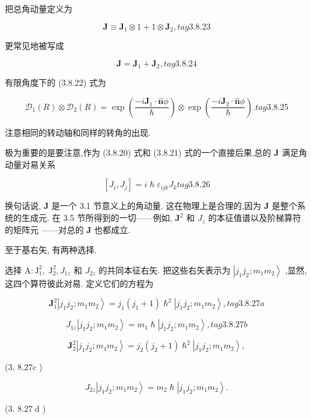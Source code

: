 把总角动量定义为

$$
\mathbf{J} \equiv {\mathbf{J}}_{1} \otimes 1 + 1 \otimes {\mathbf{J}}_{2}, tag{3.8.23}
$$

更常见地被写成

$$
\mathbf{J} = {\mathbf{J}}_{1} + {\mathbf{J}}_{2}, tag{3.8.24}
$$

有限角度下的 (3.8.22) 式为

$$
{\mathcal{D}}_{1}\left( R\right) \otimes {\mathcal{D}}_{2}\left( R\right) = \exp \left( \frac{-i{\mathbf{J}}_{1} \cdot \widehat{\mathbf{n}}\phi }{\hslash }\right) \otimes \exp \left( \frac{-i{\mathbf{J}}_{2} \cdot \widehat{\mathbf{n}}\phi }{\hslash }\right) . tag{3.8.25}
$$

注意相同的转动轴和同样的转角的出现.

极为重要的是要注意,作为 (3.8.20) 式和 (3.8.21) 式的一个直接后果,总的 $\mathbf{J}$ 满足角动量对易关系

$$
\left\lbrack {{J}_{i},{J}_{j}}\right\rbrack = i\hslash {\varepsilon }_{ijk}{J}_{k} tag{3.8.26}
$$

换句话说, $\mathbf{J}$ 是一个 3.1 节意义上的角动量. 这在物理上是合理的,因为 $\mathbf{J}$ 是整个系统的生成元. 在 3.5 节所得到的一切——例如, ${\mathbf{J}}^{2}$ 和 ${J}_{z}$ 的本征值谱以及阶梯算符的矩阵元 ——对总的 $\mathbf{J}$ 也都成立.

至于基右矢, 有两种选择.

选择 $\mathrm{A} : {\mathrm{J}}_{1}^{2},{\mathrm{\;J}}_{2}^{2},{J}_{1z}$ 和 ${J}_{2z}$ 的共同本征右矢. 把这些右矢表示为 $\left| {{j}_{1}{j}_{2};{m}_{1}{m}_{2}}\right\rangle$ ,显然, 这四个算符彼此对易. 定义它们的方程为

$$
{\mathbf{J}}_{1}^{2}\left| {{j}_{1}{j}_{2};{m}_{1}{m}_{2}}\right\rangle = {j}_{1}\left( {{j}_{1} + 1}\right) {\hslash }^{2}\left| {{j}_{1}{j}_{2};{m}_{1}{m}_{2}}\right\rangle , tag{3.8.27a}
$$

$$
{J}_{1z}\left| {{j}_{1}{j}_{2};{m}_{1}{m}_{2}}\right\rangle = {m}_{1}\hslash \left| {{j}_{1}{j}_{2};{m}_{1}{m}_{2}}\right\rangle , tag{3.8.27b}
$$

$$
{\mathbf{J}}_{2}^{2}\left| {{j}_{1}{j}_{2};{m}_{1}{m}_{2}}\right\rangle = {j}_{2}\left( {{j}_{2} + 1}\right) {\hslash }^{2}\left| {{j}_{1}{j}_{2};{m}_{1}{m}_{2}}\right\rangle ,
$$

(3. ${8.27}\mathrm{c}$ )

$$
{J}_{2z}\left| {{j}_{1}{j}_{2};{m}_{1}{m}_{2}}\right\rangle = {m}_{2}\hslash \left| {{j}_{1}{j}_{2};{m}_{1}{m}_{2}}\right\rangle .
$$

(3. ${8.27}\mathrm{\;d}$ )

